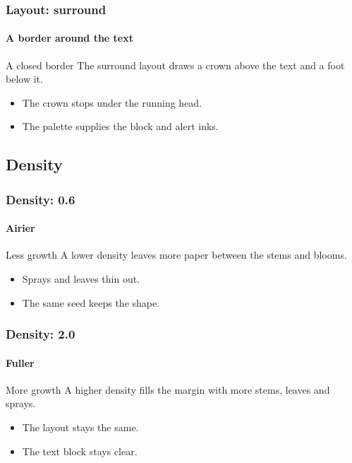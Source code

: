 \documentclass[aspectratio=169]{beamer}
\begin{document}
\begin{frame}
  \frametitle{Layout: surround}
  \framesubtitle{A border around the text}
  \begin{block}{A closed border}
    The surround layout draws a crown above the text and a foot below it.
  \end{block}
  \begin{itemize}
    \item The crown stops under the running head.
    \item The palette supplies the block and alert inks.
  \end{itemize}
\end{frame}

\subsection{Density}

\begin{frame}
  \frametitle{Density: 0.6}
  \framesubtitle{Airier}
  \begin{block}{Less growth}
    A lower density leaves more paper between the stems and blooms.
  \end{block}
  \begin{itemize}
    \item Sprays and leaves thin out.
    \item The same seed keeps the shape.
  \end{itemize}
\end{frame}

\begin{frame}
  \frametitle{Density: 2.0}
  \framesubtitle{Fuller}
  \begin{block}{More growth}
    A higher density fills the margin with more stems, leaves and sprays.
  \end{block}
  \begin{itemize}
    \item The layout stays the same.
    \item The text block stays clear.
  \end{itemize}
\end{frame}
\end{document}
